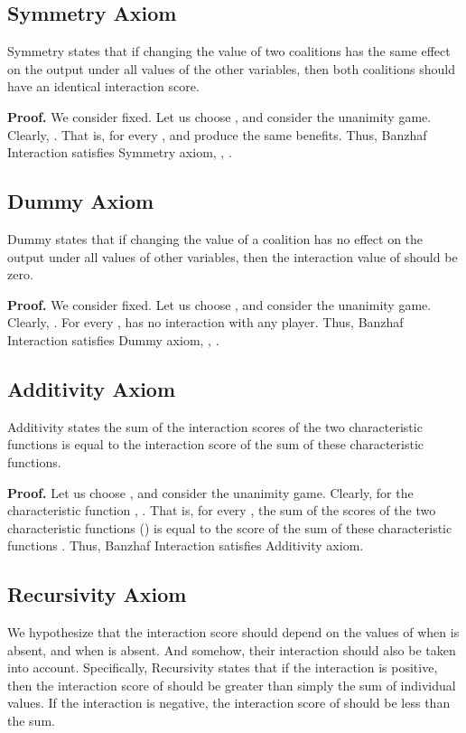 \documentclass[10pt,twocolumn,letterpaper]{article}
\newcommand{\myparagraph}[1]{\textbf{#1}\hspace{1.8ex}}
\begin{document}
{\subsection{Symmetry Axiom}
Symmetry states that if changing the value of two coalitions has the same effect on the output under all values of the other variables, then both coalitions should have an identical interaction score. 

\myparagraph{Proof.} We consider  fixed. Let us choose , and consider the unanimity game. Clearly, . That is, for every ,  and  produce the same benefits. Thus, Banzhaf Interaction satisfies Symmetry axiom, \ie, .

\subsection{Dummy Axiom}
Dummy states that if changing the value of a coalition  has no effect on the output under all values of other variables, then the interaction value of  should be zero. 

\myparagraph{Proof.} We consider  fixed. Let us choose , and consider the unanimity game. Clearly, . For every ,  has no interaction with any player. Thus, Banzhaf Interaction satisfies Dummy axiom, \ie, .

\subsection{Additivity Axiom}
Additivity states the sum of the interaction scores of the two characteristic functions is equal to the interaction score of the sum of these characteristic functions. 

\myparagraph{Proof.} Let us choose , and consider the unanimity game. Clearly, for the characteristic function , . That is, for every , the sum of the scores of the two characteristic functions () is equal to the score of the sum of these characteristic functions . Thus, Banzhaf Interaction satisfies Additivity axiom.

\subsection{Recursivity Axiom}
We hypothesize that the interaction score should depend on the values of  when  is absent, and  when  is absent. And somehow, their interaction should also be taken into account. Specifically,
Recursivity states that if the interaction is positive, then the interaction score of  should be greater than simply the sum of individual values. If the interaction is negative, the interaction score of  should be less than the sum.

}
\end{document}
